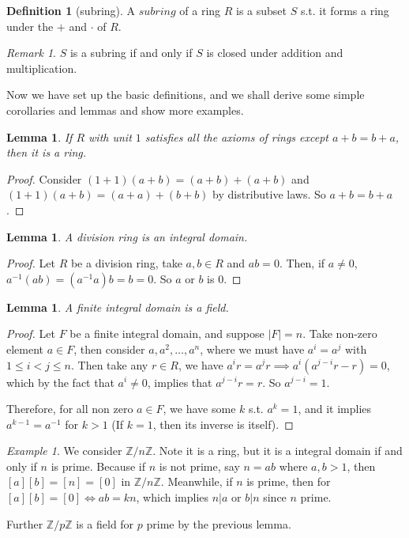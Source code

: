 \documentclass{article}
\newtheorem{lemma}[thm]{Lemma}
\theoremstyle{definition}
\newtheorem{define}[thm]{Definition}
\theoremstyle{remark}
\newtheorem*{rmk}{Remark}
\newtheorem*{eg}{Example}
\begin{document}
\begin{define}[subring]
  A $subring$ of a ring $R$ is a subset $S$ s.t. it forms a ring under the $+$ and $\cdot$ 
  of $R$.
\end{define}

\begin{rmk}
  $S$ is a subring if and only if $S$ is closed under addition and multiplication. 
\end{rmk}

Now we have set up the basic definitions, and we shall derive some simple corollaries and lemmas
and show more examples. 

\begin{lemma}
  If $R$ with unit $1$ satisfies all the axioms of rings except $a + b = b + a$, then 
  it is a ring. 
\end{lemma}
\begin{proof}
  Consider $(1 + 1)(a + b) = (a + b) + (a + b)$ and $(1 + 1)(a + b) = (a + a) + (b + b)$ by 
  distributive laws. So $a+b = b+a$.
\end{proof}

\begin{lemma}
  A division ring is an integral domain.
\end{lemma}
\begin{proof}
  Let $R$ be a division ring, take $a,b\in R$ and $ab = 0$. Then, if $a \neq 0$, 
  $a^{-1} (ab) = (a^{-1} a)b = b = 0$. So $a$ or $b$ is $0$.
\end{proof}

\begin{lemma}
  A finite integral domain is a field. 
\end{lemma}
\begin{proof}
  Let $F$ be a finite integral domain, and suppose $|F| = n$. 
  Take non-zero element $a \in F$, then consider $a, a^2, \ldots, a^n$, where 
  we must have $a^i = a^j$ with $1 \leq i < j \leq n$. Then take any $r \in R$, 
  we have $a^i r = a^j r \implies a^i (a^{j-i} r - r) = 0 $, which by the fact that $a^i \neq 0$, 
  implies that $a^{j-i} r = r$. So $a^{j-i} = 1$. 
  
  Therefore, for all non zero $ a \in F$, we have some $k$ s.t. $a^k = 1$, 
  and it implies $a^{k-1} = a^{-1}$ for $k > 1$ (If $k = 1$, then its inverse is itself). 
\end{proof}

\begin{eg}
  We consider $\mathbb{Z}/n\mathbb{Z}$. Note it is a ring, but it is a integral domain 
  if and only if $n$ is prime. Because if $n$ is not prime, say $n = ab$ where $a,b>1$, 
  then $[a][b] = [n] = [0]$ in $\mathbb{Z}/n\mathbb{Z}$. Meanwhile, if $n$ is prime, 
  then for $[a][b] = [0] \iff ab = kn$, which implies $n|a$ or $b|n$ since $n$ prime. 

  Further $\mathbb{Z}/p\mathbb{Z}$ is a field for $p$ prime by the previous lemma.
\end{eg}
\end{document}
